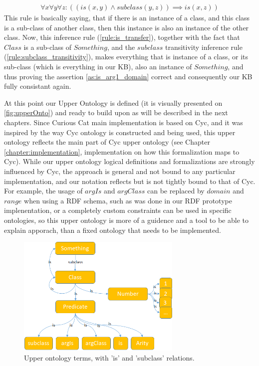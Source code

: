 \begin{equation}\label{rule:is_transfer}
\begin{gathered}
  \forall x \forall y \forall z: ((is(x,y) \land subclass(y,z)) \implies is(x,z))
\end{gathered} \end{equation}
This rule is basically saying, that if there is an instance of a class, and this
class is a sub-class of another class, then this instance is also an instance of
the other class. Now, this inference rule (\ref{rule:is_transfer}), together 
with the fact that $Class$ is a sub-class of $Something$, and the $subclass$
transitivity inference rule (\ref{rule:subclass_transitivity}), makes everything
 that is instance of a 
class, or its sub-class (which is everything in our KB), also an instance of
$Something$, and thus proving the assertion \ref{as:is_arg1_domain} correct and 
consequently our KB fully consistant again.

At this point our Upper Ontology is defined (it is visually presented on
\autoref{fig:upperOnto}) and ready to build upon as will be
described in the next chapters. Since Curious Cat main implementation is based
on Cyc, and it was inspired by the way Cyc ontology is constructed and being 
used, this upper ontology reflects the main part of Cyc upper ontology 
(see Chapter \ref{chapter:implementation}, implementation on how this 
formalization maps to Cyc). While our upper ontology logical definitions and 
formalizations are strongly influenced by Cyc, the approach is general and not 
bound to any particular implementation, and our notation reflects but is not 
tightly bound to that of Cyc. For example, the usage of $argIs$ and $argClass$
can be replaced by $domain$ and $range$ when using a RDF schema, such as was 
done in our RDF prototype implenentation\parencite{Bradesko2012a}, or a 
completely custom constraints can be used in specific ontologies, so this
upper ontology is more of a guidence and a tool to be able to explain apporach,
than a fixed ontology that needs to be implemented.

\begin{figure}[H]
	\centering
		\includegraphics[width=0.7\textwidth]{figures/upperOntology.png}
	\caption{Upper ontology terms, with 'is' and 'subclass' relations.}
	\label{fig:upperOnto}
\end{figure}

